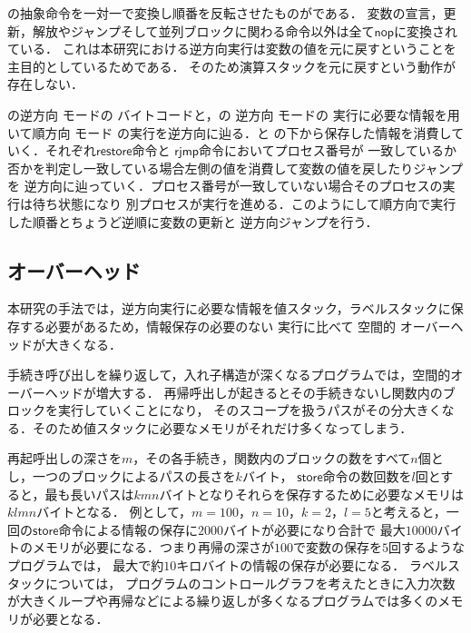 \documentclass[submit,PRO]{ipsj}
\newcommand{\bcode}[1]{$\mathsf{#1}$}
\begin{document}
の抽象命令を一対一で変換し順番を反転させたものがである．
変数の宣言，更新，解放やジャンプそして並列ブロックに関わる命令以外は全て\bcode{nop}に変換されている．
これは本研究における逆方向実行は変数の値を元に戻すということを主目的としているためである．
そのため演算スタックを元に戻すという動作が存在しない．

の逆方向%
モードの%
バイトコードと，の
逆方向%
モードの%
実行に必要な情報を用いて順方向%
モード%
の実行を逆方向に辿る．と
の下から保存した情報を消費していく．それぞれ\bcode{restore}命令と
\bcode{rjmp}命令においてプロセス番号が
一致しているか否かを判定し一致している場合左側の値を消費して変数の値を戻したりジャンプを
逆方向に辿っていく．プロセス番号が一致していない場合そのプロセスの実行は待ち状態になり
別プロセスが実行を進める．このようにして順方向で実行した順番とちょうど逆順に変数の更新と
逆方向ジャンプを行う．

\subsection{オーバーヘッド} %

本研究の手法では，逆方向実行に必要な情報を値スタック，ラベルスタックに保存する必要があるため，情報保存の必要のない
実行に比べて%
空間的%
オーバーヘッドが大きくなる．

手続き呼び出しを繰り返して，入れ子構造が深くなるプログラムでは，空間的オーバーヘッドが増大する．
再帰呼出しが起きるとその手続きないし関数内のブロックを実行していくことになり，
そのスコープを扱うパスがその分大きくなる．そのため値スタックに必要なメモリがそれだけ多くなってしまう．

再起呼出しの深さを$m$，その各手続き，関数内のブロックの数をすべて$n$個とし，一つのブロックによるパスの長さを$k$バイト，
\bcode{store}命令の数回数を$l$回とすると，最も長いパスは$kmn$バイトとなりそれらを保存するために必要なメモリは$klmn$バイトとなる．
例として，$m=100$，$n=10$，$k=2$，$l=5$と考えると，一回の\bcode{store}命令による情報の保存に$2000$バイトが必要になり合計で
最大$10000$バイトのメモリが必要になる．つまり再帰の深さが$100$で変数の保存を$5$回するようなプログラムでは，
最大で約$10$キロバイトの情報の保存が必要になる．
ラベルスタックについては，
プログラムのコントロールグラフを考えたときに入力次数が大きくループや再帰などによる繰り返しが多くなるプログラムでは多くのメモリが必要となる．
\end{document}

